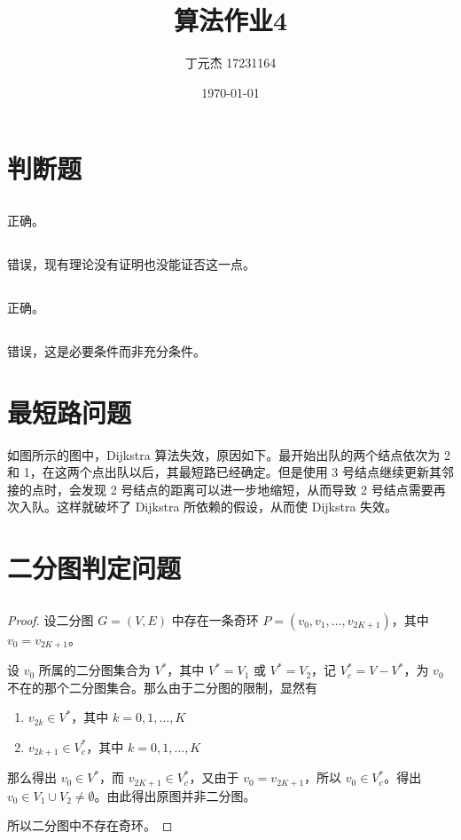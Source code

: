 \documentclass[UTF8]{ctexart}
\title{算法作业4}
\author{丁元杰 17231164}
\date{\today}
\newtheorem*{proof}{证}[section]
\begin{document}
\maketitle

\section{判断题}
    \subsection{}
        正确。
    \subsection{}
        错误，现有理论没有证明也没能证否这一点。
    \subsection{}
        正确。
    \subsection{}
        错误，这是必要条件而非充分条件。

\section{最短路问题}
    如图所示的图中，Dijkstra 算法失效，原因如下。最开始出队的两个结点依次为 2 和 1，在这两个点出队以后，其最短路已经确定。但是使用 3 号结点继续更新其邻接的点时，会发现 2 号结点的距离可以进一步地缩短，从而导致 2 号结点需要再次入队。这样就破坏了 Dijkstra 所依赖的假设，从而使 Dijkstra 失效。
    
\section{二分图判定问题}
    \subsection{}
    \begin{proof}
        设二分图 $G=(V, E)$ 中存在一条奇环 $P=(v_0, v_1, \dots, v_{2K+1})$，其中 $v_0=v_{2K+1}$。

        设 $v_0$ 所属的二分图集合为 $V^*$，其中 $V^* = V_1$ 或 $V^* = V_2$，记 $V^*_c = V-V^*$，为 $v_0$ 不在的那个二分图集合。那么由于二分图的限制，显然有 
        \begin{enumerate}
            \item $v_{2k}\in V^*$，其中 $k = 0, 1, \dots, K$
            \item $v_{2k+1}\in V^*_c$，其中 $k = 0, 1, \dots, K$
        \end{enumerate}

        那么得出 $v_0\in V^*$，而 $v_{2K+1}\in V^*_c$，又由于 $v_0 = v_{2K+1}$，所以 $v_0\in V^*_c$。得出 $v_0\in V_1 \cup V_2 \neq \emptyset$。由此得出原图并非二分图。

        所以二分图中不存在奇环。

    \end{proof}
\end{document}
